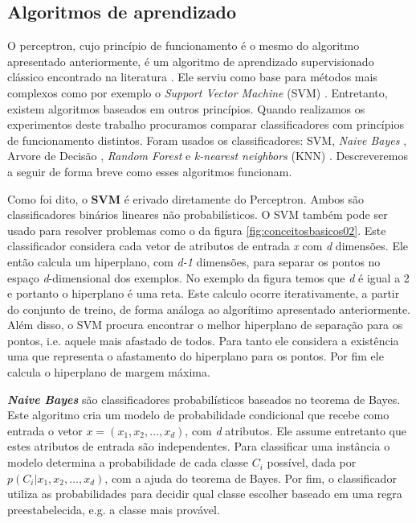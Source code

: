 \subsection{Algoritmos de aprendizado}

O perceptron, cujo princípio de funcionamento é o mesmo do algoritmo apresentado anteriormente, é um algoritmo de aprendizado supervisionado clássico encontrado na literatura \cite{Rosenblatt}.
Ele serviu como base para métodos mais complexos como por exemplo o \textit{Support Vector Machine} (SVM) \cite{Chang}.
Entretanto, existem algoritmos baseados em outros princípios.
Quando realizamos os experimentos deste trabalho procuramos comparar classificadores com princípios de funcionamento distintos.
Foram usados os classificadores: SVM, \textit{Naive Bayes} \cite{Murphy}, Arvore de Decisão \cite{Quinlan}, \textit{Random Forest} \cite{Breiman} e \textit{k-nearest neighbors} (KNN) \cite{Duda}.
Descreveremos a seguir de forma breve como esses algoritmos funcionam.

Como foi dito, o \textbf{SVM} é erivado diretamente do Perceptron.
Ambos são classificadores binários lineares não probabilísticos.
O SVM também pode ser usado para resolver problemas como o da figura \ref{fig:conceitosbasicos02}.
Este classificador considera cada vetor de atributos de entrada \textit{x} com \textit{d} dimensões.
Ele então calcula um hiperplano, com \textit{d-1} dimensões, para separar os pontos no espaço \textit{d}-dimensional dos exemplos.
No exemplo da figura temos que \textit{d} é igual a 2 e portanto o hiperplano é uma reta.
Este calculo ocorre iterativamente, a partir do conjunto de treino, de forma análoga ao algorítimo apresentado anteriormente.
Além disso, o SVM procura encontrar o melhor hiperplano de separação para os pontos, i.e. aquele mais afastado de todos. 
Para tanto ele considera a existência uma  que representa o afastamento do hiperplano para os pontos.
Por fim ele calcula o hiperplano de margem máxima.

\textbf{\textit{Naive Bayes}} são classificadores probabilísticos baseados no teorema de Bayes.
Este algoritmo cria um modelo de probabilidade condicional que recebe como entrada o vetor $ \textit{x} = (x_1, x_2, ... , x_d) $, com \textit{d} atributos.
Ele assume entretanto que estes atributos de entrada são independentes.
Para classificar uma instância o modelo determina a probabilidade de cada classe $C_i$ possível, dada por $p(C_i|x_1, x_2, ... , x_d)$, com a ajuda do teorema de Bayes.
Por fim, o classificador utiliza as probabilidades para decidir qual classe escolher baseado em uma regra preestabelecida, e.g. a classe mais provável.

